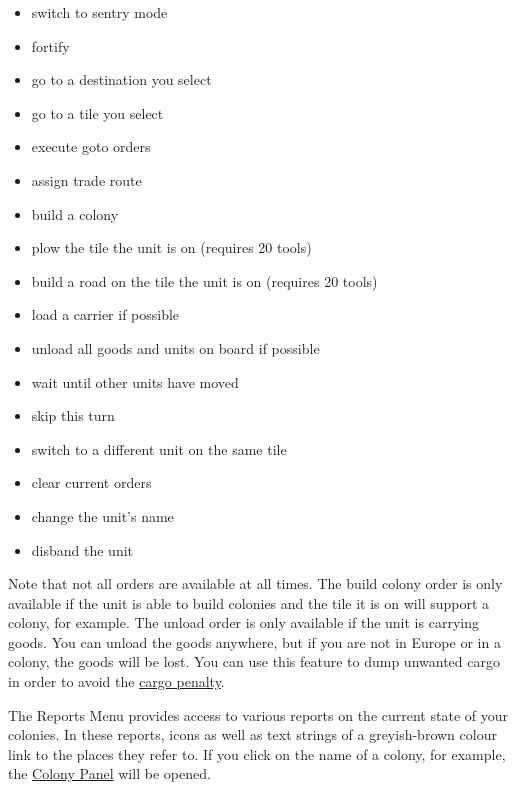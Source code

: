 \documentclass[12pt]{book}
\begin{document}
\begin{itemize}
\item switch to sentry mode
\item fortify
\item go to a destination you select
\item go to a tile you select
\item execute goto orders
\item assign trade route
\item build a colony
\item plow the tile the unit is on (requires 20 tools)
\item build a road on the tile the unit is on (requires 20 tools)
\item load a carrier if possible
\item unload all goods and units on board if possible
\item wait until other units have moved
\item skip this turn
\item switch to a different unit on the same tile
\item clear current orders
\item change the unit's name
\item disband the unit
\end{itemize}

Note that not all orders are available at all times. The build colony
order is only available if the unit is able to build colonies and the
tile it is on will support a colony, for example. The unload order is
only available if the unit is carrying goods. You can unload the goods
anywhere, but if you are not in Europe or in a colony, the goods will
be lost.  You can use this feature to dump unwanted cargo in order to avoid the \hyperlink{Cargo Penalty}{cargo
  penalty}.

The \hypertarget{reports menu}{Reports Menu} provides access to
various reports on the current state of your colonies. In these
reports, icons as well as text strings of a greyish-brown colour link
to the places they refer to. If you click on the name of a colony, for
example, the \hyperlink{colony panel}{Colony Panel} will be opened.
\end{document}
